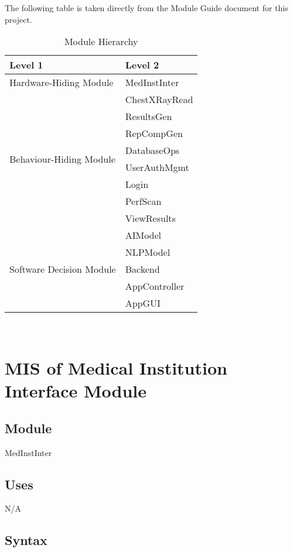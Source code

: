 \documentclass[12pt, titlepage]{article}
\begin{document}
The following table is taken directly from the Module Guide document for this project.

\begin{table}[H]
  \centering
  \begin{tabular}{p{} p{}}
    \toprule
    \textbf{Level 1} & \textbf{Level 2} \\
    \midrule

    {Hardware-Hiding Module} & MedInstInter \\
    \midrule

    \multirow{8}{0.3\textwidth}{Behaviour-Hiding Module} & ChestXRayRead \\
    & ResultsGen \\
    & RepCompGen \\
    & DatabaseOps \\
    & UserAuthMgmt \\
    & Login \\ 
    & PerfScan \\
    & ViewResults \\
    \midrule

    \multirow{5}{0.3\textwidth}{Software Decision Module} & AIModel \\
    & NLPModel \\
    & Backend \\
    & AppController \\
    & AppGUI \\
    \bottomrule

  \end{tabular}
  \caption{Module Hierarchy}
  \label{TblMH}
\end{table}

~\newpage

\section{MIS of Medical Institution Interface Module} \label{mMedInstInter}

\subsection{Module}
MedInstInter

\subsection{Uses}
N/A

\subsection{Syntax}
\end{document}
